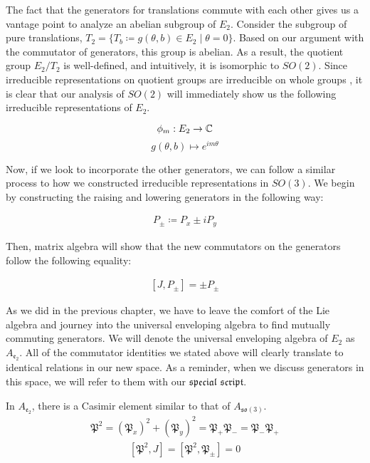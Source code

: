The fact that the generators for translations commute with each other gives us a vantage point to analyze an abelian subgroup of $E_2$. Consider the subgroup of pure translations, $T_2 = \{ T_b \coloneq g(\theta,b)\in E_2 \mid \theta=0\}$. Based on our argument with the commutator of generators, this group is abelian. As a result, the quotient group $E_2/T_2$ is well-defined, and intuitively, it is isomorphic to $SO(2)$. Since irreducible representations on quotient groups are irreducible on whole groups \cite{Mendes}, it is clear that our analysis of $SO(2)$ will immediately show us the following irreducible representations of $E_2$.

$$\phi_m:E_2\rightarrow \mathbb{C}$$
$$g(\theta,b)\mapsto e^{im\theta}$$

Now, if we look to incorporate the other generators, we can follow a similar process to how we constructed irreducible representations in $SO(3)$. We begin by constructing the raising and lowering generators in the following way:

\begin{equation}
\begin{aligned}
	P_\pm \coloneq P_x \pm iP_y
\end{aligned}
\end{equation}

 Then, matrix algebra will show that the new commutators on the generators follow the following equality:

\begin{equation}
\begin{aligned}
	[J,P_\pm] = \pm P_\pm 
\end{aligned}
\end{equation}

As we did in the previous chapter, we have to leave the comfort of the Lie algebra and journey into the universal enveloping algebra to find mutually commuting generators. We will denote the universal enveloping algebra of $E_2$ as $A_{\mathfrak{e_2}}$. All of the commutator identities we stated above will clearly translate to identical relations in our new space. As a reminder, when we discuss generators in this space, we will refer to them with our $\mathfrak{special}$ $\mathfrak{script}$. 

In $A_{\mathfrak{e_2}}$, there is a Casimir element similar to that of $A_{\mathfrak{so}(3)}$. 
\begin{equation}
\begin{aligned}
	\mathfrak{P}^2 = (\mathfrak{P}_x)^2 + (\mathfrak{P}_y)^2 = \mathfrak{P}_+\mathfrak{P}_- = \mathfrak{P}_-\mathfrak{P}_+
\end{aligned}
\end{equation}
\begin{equation}
\begin{aligned}
	[\mathfrak{P}^2,J] =[\mathfrak{P}^2,\mathfrak{P}_\pm]  = 0
\end{aligned}
\end{equation}

